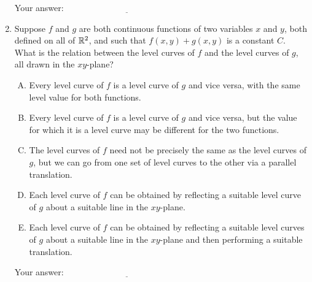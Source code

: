 \documentclass[10pt]{amsart}
\begin{document}
\begin{enumerate}
  \vspace{0.1in}
  Your answer: $\underline{\qquad\qquad\qquad\qquad\qquad\qquad\qquad}$
  \vspace{0.1in}

\item Suppose $f$ and $g$ are both continuous functions of two
  variables $x$ and $y$, both defined on all of $\mathbb{R}^2$, and such that
  $f(x,y) + g(x,y)$ is a constant $C$. What is the relation between
  the level curves of $f$ and the level curves of $g$, all drawn in
  the $xy$-plane?

  \begin{enumerate}[(A)]
  \item Every level curve of $f$ is a level curve of $g$ and vice
    versa, with the same level value for both functions.
  \item Every level curve of $f$ is a level curve of $g$ and vice
    versa, but the value for which it is a level curve may be different
    for the two functions.
  \item The level curves of $f$ need not be precisely the same as the
    level curves of $g$, but we can go from one set of level curves to
    the other via a parallel translation.
  \item Each level curve of $f$ can be obtained by reflecting a
    suitable level curve of $g$ about a suitable line in the
    $xy$-plane.
  \item Each level curve of $f$ can be obtained by reflecting a
    suitable level curves of $g$ about a suitable line in the
    $xy$-plane and then performing a suitable translation.
  \end{enumerate}

  \vspace{0.1in}
  Your answer: $\underline{\qquad\qquad\qquad\qquad\qquad\qquad\qquad}$
  \vspace{0.1in}

\end{enumerate}
\end{document}
